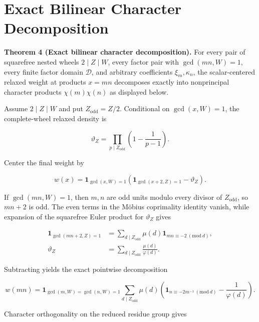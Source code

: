 \section{Exact Bilinear Character Decomposition}

\textbf{Theorem 4 (Exact bilinear character decomposition).}
For every pair of squarefree nested wheels $2\mid Z\mid W$, every factor pair
with $\gcd(mn,W)=1$, every finite factor domain $\mathcal D$, and arbitrary
coefficients $\xi_m,\kappa_n$, the scalar-centered relaxed weight at products
$x=mn$ decomposes exactly into nonprincipal character products
$\chi(m)\chi(n)$ as displayed below.

Assume $2\mid Z\mid W$ and put $Z_{\mathrm{odd}}=Z/2$. Conditional on
$\gcd(x,W)=1$, the complete-wheel relaxed density is

\begin{equation*}
\vartheta_Z
=
\prod_{p\mid Z_{\mathrm{odd}}}
\left(1-\frac1{p-1}\right).
\end{equation*}

Center the final weight by

\begin{equation*}
w(x)
=
\mathbf1_{\gcd(x,W)=1}
\left(
\mathbf1_{\gcd(x+2,Z)=1}-\vartheta_Z
\right).
\end{equation*}

If $\gcd(mn,W)=1$, then $m,n$ are odd units modulo every divisor of
$Z_{\mathrm{odd}}$, so $mn+2$ is odd. The even terms in the Möbius
coprimality identity vanish, while expansion of the squarefree Euler product
for $\vartheta_Z$ gives

\begin{equation*}
\begin{aligned}
\mathbf1_{\gcd(mn+2,Z)=1}
&=
\sum_{d\mid Z_{\mathrm{odd}}}
\mu(d)\mathbf1_{mn\equiv-2\ (\mathrm{mod}\ d)},\\
\vartheta_Z
&=
\sum_{d\mid Z_{\mathrm{odd}}}\frac{\mu(d)}{\varphi(d)}.
\end{aligned}
\end{equation*}

Subtracting yields the exact pointwise decomposition

\begin{equation*}
w(mn)
=
\mathbf1_{\gcd(m,W)=\gcd(n,W)=1}
\sum_{d\mid Z_{\mathrm{odd}}}
\mu(d)
\left(
\mathbf1_{n\equiv-2m^{-1}\ (\mathrm{mod}\ d)}
-\frac1{\varphi(d)}
\right).
\end{equation*}

Character orthogonality on the reduced residue group gives

